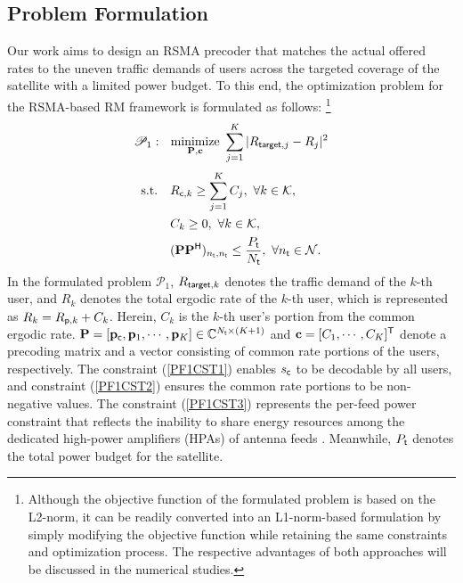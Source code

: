\documentclass[draftclsnofoot, onecolumn, comsoc, 12pt]{IEEEtran}
\DeclareMathOperator*{\minimize}{minimize}
\begin{document}
\subsection{Problem Formulation}
Our work aims to design an RSMA precoder that matches the actual offered rates to the uneven traffic demands of users across the targeted coverage of the satellite with a limited power budget.
To this end, the optimization problem for the RSMA-based RM framework is formulated as follows: \footnote{ Although the objective function of the formulated problem is based on the L2-norm, it can be readily converted into an L1-norm-based formulation by simply modifying the objective function while retaining the same constraints and optimization process. The respective advantages of both approaches will be discussed in the numerical studies.}
\begin{align}
\nonumber
\mathscr{P}_1: \,\,\,\, 
\minimize_{\mathbf{P}, \mathbf{c}} \,\, \sum_{j=1}^{K} \vert R_{{\sf target}{,j}}-R_{j} \vert^{2}
\end{align}\setcounter{equation}{19}%
\begin{subequations}\label{condition}
\begin{align}
\mathrm{s.t.}\,\,\,\,\,\,
\label{PF1CST1}
&R_{{\sf c},k} \geq \sum_{j=1}^{K}C_{j}, \,\, \forall k \in \mathcal{K},\\
\label{PF1CST2}
&C_k \geq 0, \,\, \forall k \in \mathcal{K}, \\
\label{PF1CST3}
&{(\mathbf{P}\mathbf{P}^{\sf{H}}})_{{n_{\sf{t}}},{n_{\sf{t}}}} \leq \frac{P_{\sf{t}}}{N_{\sf{t}}}, \,\, \forall {n_{\sf{t}}} \in \mathcal{N}.
\end{align}
\end{subequations}
In the formulated problem $\mathscr{P}_1$, $R_{{\sf target}{,k}}$ denotes the traffic demand of the $k$-th user, and $R_{k}$ denotes the total ergodic rate of the $k$-th user, which is represented as $R_{k}=R_{{\sf{p}},k}+C_{k}$. Herein, $C_{k}$ is the $k$-th user's portion from the common ergodic rate.
$\mathbf{P}=[\mathbf{p}_{\sf{c}}, \mathbf{p}_1,\cdots,\mathbf{p}_K]\in \mathbb{C}^{{N_{\sf{t}}}\times{(K+1)}}$ and $\mathbf{c}=[C_1,\cdots, C_K]^{\sf{T}}$ denote a precoding matrix and a vector consisting of common rate portions of the users, respectively. 
The constraint (\ref{PF1CST1}) enables $s_{\sf{c}}$ to be decodable by all users, and constraint (\ref{PF1CST2}) ensures the common rate portions to be non-negative values.
The constraint (\ref{PF1CST3}) represents the per-feed power constraint that reflects the inability to share energy resources among the dedicated high-power amplifiers (HPAs) of antenna feeds \cite{perez2019signal}. Meanwhile, $P_{\sf{t}}$ denotes the total power budget for the satellite.
\end{document}
